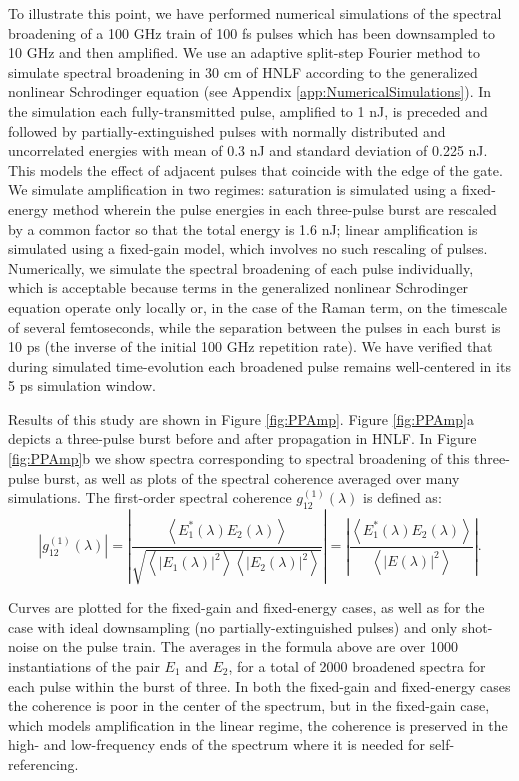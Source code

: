 To illustrate this point, we have performed numerical simulations of the spectral broadening of a 100 GHz train of 100 fs pulses which has been downsampled to 10 GHz and then amplified. We use an adaptive \cite{Heidt2009} split-step Fourier method \cite{Hult2007} to simulate spectral broadening in 30 cm of HNLF according to the generalized nonlinear Schrodinger equation \cite{Agrawal2007} (see Appendix \ref{app:NumericalSimulations}). In the simulation each fully-transmitted pulse, amplified to 1 nJ, is preceded and followed by partially-extinguished pulses with normally distributed and uncorrelated energies with mean of 0.3 nJ and standard deviation of 0.225 nJ. This models the effect of adjacent pulses that coincide with the edge of the gate. We simulate amplification in two regimes: saturation is simulated using a fixed-energy method wherein the pulse energies in each three-pulse burst are rescaled by a common factor so that the total energy is 1.6 nJ; linear amplification is simulated using a fixed-gain model, which involves no such rescaling of pulses. Numerically, we simulate the spectral broadening of each pulse individually, which is acceptable because terms in the generalized nonlinear Schrodinger equation operate only locally or, in the case of the Raman term, on the timescale of several femtoseconds, while the separation between the pulses in each burst is 10 ps (the inverse of the initial 100 GHz repetition rate).  We have verified that during simulated time-evolution each broadened pulse remains well-centered in its 5 ps simulation window. 

Results of this study are shown in Figure \ref{fig:PPAmp}. Figure \ref{fig:PPAmp}a depicts a three-pulse burst before and after propagation in HNLF. In Figure \ref{fig:PPAmp}b we show spectra corresponding to spectral broadening of this three-pulse burst, as well as plots of the spectral coherence averaged over many simulations. The first-order spectral coherence $g_{12}^{(1)} (\lambda)$ is defined as:
\begin{equation}
\left|g_{12}^{(1)} (\lambda)\right|=\left|\frac{\left<E_1^*(\lambda)E_2(\lambda)\right>}{\sqrt{\left<|E_1(\lambda)|^2\right>\left<|E_2(\lambda)|^2\right>}}\right|=\left|\frac{\left<E_1^*(\lambda)E_2(\lambda)\right>}{\left<|E(\lambda)|^2\right>}\right|.
\end{equation}

Curves are plotted for the fixed-gain and fixed-energy cases, as well as for the case with ideal downsampling (no partially-extinguished pulses) and only shot-noise on the pulse train. The averages in the formula above are over 1000 instantiations of the pair $E_1$ and $E_2$, for a total of 2000 broadened spectra for each pulse within the burst of three. In both the fixed-gain and fixed-energy cases the coherence is poor in the center of the spectrum, but in the fixed-gain case, which models amplification in the linear regime, the coherence is preserved in the high- and low-frequency ends of the spectrum where it is needed for self-referencing.

